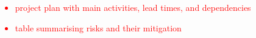 \textcolor{red}{
\begin{itemize}
	\item
		project plan with main activities, lead times, and dependencies
	\item
		table summarising risks and their mitigation
\end{itemize}
}

